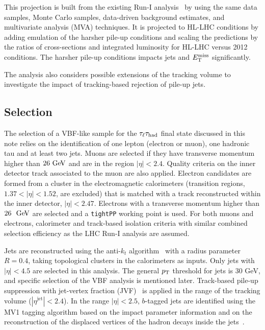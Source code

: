 This projection is built from the existing Run-I analysis~\cite{HIGG-2013-32} by using the same data samples, Monte Carlo samples, data-driven background estimates, and multivariate analysis (MVA) techniques. It is projected to HL-LHC conditions by adding emulation of the harsher pile-up conditions and scaling the predictions by the ratios of cross-sections and integrated luminosity for HL-LHC versus 2012 conditions. The harsher pile-up conditions impacts jets and $E_{\mathrm{T}}^{\mathrm{miss}}$ significantly.

The analysis also considers possible extensions of the tracking volume to investigate the impact of tracking-based rejection of pile-up jets. 

\subsection{Selection}

The selection of a VBF-like sample for the $\tau_\ell\tau_\text{had}$ final state discussed in this note relies on the identification of one lepton (electron or muon), one hadronic tau and at least two jets. Muons are selected if they have transverse momentum higher than $26 \GeV$ and are in the region $|\eta|<2.4$. Quality criteria on the inner detector track associated to the muon are also applied. Electron candidates are formed from a cluster in the electromagnetic calorimeters (transition regions, $1.37<|\eta|<1.52$, are excluded) that is matched with a track reconstructed within the inner detector, $|\eta|<2.47$. Electrons with a transverse momentum higher than $26~\GeV$ are selected and a \texttt{tightPP} working point is used. For both muons and electrons, calorimeter and track-based isolation criteria with similar combined selection efficiency as the LHC Run-I analysis are assumed.

Jets are reconstructed using the anti-$k_t$ algorithm~\cite{2008.antikt} with a radius parameter $R=0.4$, taking topological clusters in the calorimeters as inputs. Only jets with $|\eta|<4.5$ are selected in this analysis. The general $p_{\mathrm{T}}$ threshold for jets is 30 GeV, and specific selection of the VBF analysis is mentioned later. Track-based pile-up suppression with jet-vertex fraction (JVF)~\cite{ATLAS-CONF-2014-018} is applied in the range of the tracking volume ($|\eta^\text{jet}| < 2.4$). In the range $\left|\eta\right| < 2.5$, $b$-tagged jets are identified using the MV1 tagging algorithm based on the impact parameter information and on the reconstruction of the displaced vertices of the hadron decays inside the jets~\cite{ATLAS-CONF-2014-046}. 

